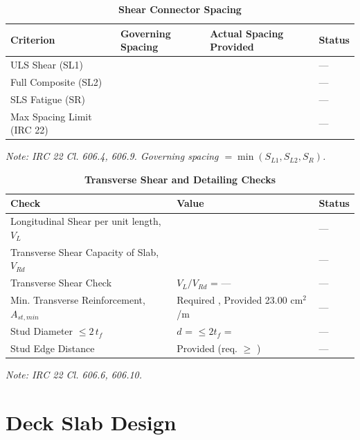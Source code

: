 \documentclass[12pt,a4paper]{report}
\numberwithin{table}{chapter}
\numberwithin{figure}{chapter}
\begin{document}
\vspace{1em}

\setlength\LTleft{0pt}
\setlength\LTright{\fill}

\begin{longtable}{|L{3.2cm}|>{\centering\arraybackslash}p{4.3cm}|>{\centering\arraybackslash}p{4.3cm}|C{2.0cm}|}
\caption{\textbf{Shear Connector Spacing}}
\hline
\textbf{Criterion} & \textbf{Governing Spacing} & \textbf{Actual Spacing Provided} & \textbf{Status} \\[6pt]
\hline
ULS Shear (SL1) &  &  & --- \\[6pt]
\hline
Full Composite (SL2) &  &  & --- \\[6pt]
\hline
SLS Fatigue (SR) &  &  & --- \\[6pt]
\hline
Max Spacing Limit (IRC 22) &  &  & --- \\[6pt]
\hline
\end{longtable}
\noindent\textit{Note: IRC 22 Cl. 606.4, 606.9. Governing spacing $= \min(S_{L1}, S_{L2}, S_R)$.}

\vspace{1em}
\begin{longtable}{|L{5.3cm}|>{\arraybackslash}p{7.2cm}|C{2.0cm}|}
\caption{\textbf{Transverse Shear and Detailing Checks}}
\hline
\textbf{Check} & \textbf{Value} & \textbf{Status} \\[6pt]
\hline
\textnormal{Longitudinal Shear per unit length, $V_L$} &  & --- \\[6pt]
\hline
\textnormal{Transverse Shear Capacity of Slab, $V_{Rd}$} &  & --- \\[6pt]
\hline
\textnormal{Transverse Shear Check} & $V_L/V_{Rd}$ = --- & --- \\[6pt]
\hline
\textnormal{Min. Transverse Reinforcement, $A_{st,min}$} & Required , Provided 23.00 cm$^2$/m & --- \\[6pt]
\hline
\textnormal{Stud Diameter $\leq 2\,t_f$} & $d$ =  $\leq 2t_f$ =  & --- \\[6pt]
\hline
\textnormal{Stud Edge Distance} & Provided  (req. $\geq$ ) & --- \\[6pt]
\hline
\end{longtable}
\noindent\textit{Note: IRC 22 Cl. 606.6, 606.10.}

\section{Deck Slab Design}
\label{sec:deck-design}
\end{document}
